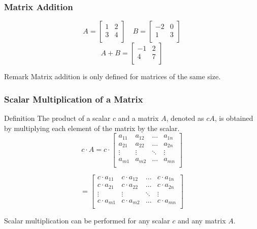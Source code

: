 \documentclass{beamer}
\begin{document}
\begin{frame}
  \frametitle{Matrix Addition}
  \begin{example}
    \[
      A = \begin{bmatrix}
        1 & 2 \\
        3 & 4 \\
      \end{bmatrix}
      \quad
      B = \begin{bmatrix}
        -2 & 0 \\
        1 & 3 \\
      \end{bmatrix}
    \]
    \[
      A + B = \begin{bmatrix}
        -1 & 2 \\
        4 & 7 \\
      \end{bmatrix}
    \]
  \end{example}

  \pause

  \begin{block}{Remark}
    Matrix addition is only defined for matrices of the same size.
  \end{block}
\end{frame}


\begin{frame}
  \frametitle{Scalar Multiplication of a Matrix}

  \begin{block}{Definition}
    The product of a scalar \(c\) and a matrix \(A\), denoted as \(cA\), is obtained by multiplying each element of the matrix by the scalar.
  \[
      c \cdot A = c \cdot \begin{bmatrix}
        a_{11} & a_{12} & \ldots & a_{1n} \\
        a_{21} & a_{22} & \ldots & a_{2n} \\
        \vdots & \vdots & \ddots & \vdots \\
        a_{m1} & a_{m2} & \ldots & a_{mn} \\
      \end{bmatrix}
    \]
    
    \[
      = \begin{bmatrix}
        c \cdot a_{11} & c \cdot a_{12} & \ldots & c \cdot a_{1n} \\
        c \cdot a_{21} & c \cdot a_{22} & \ldots & c \cdot a_{2n} \\
        \vdots & \vdots & \ddots & \vdots \\
        c \cdot a_{m1} & c \cdot a_{m2} & \ldots & c \cdot a_{mn} \\
      \end{bmatrix}
    \]
  \end{block}
  \pause

    Scalar multiplication can be performed for any scalar \(c\) and any matrix \(A\).

\end{frame}
\end{document}
